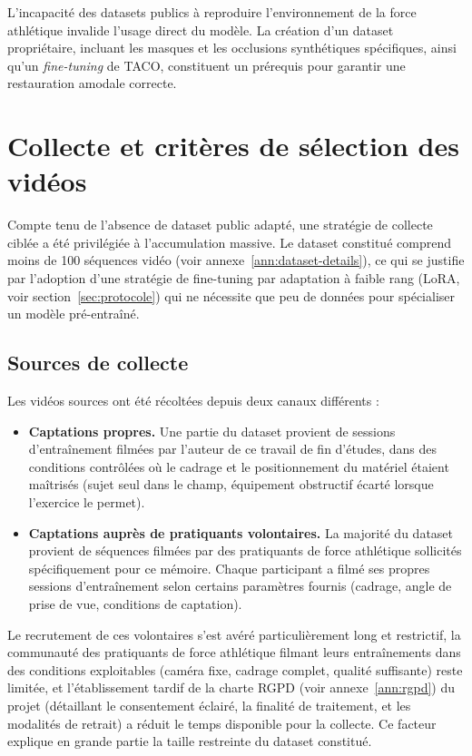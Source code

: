 L'incapacité des datasets publics à reproduire l'environnement de la force athlétique invalide l'usage direct du modèle. La création d'un dataset propriétaire, incluant les masques et les occlusions synthétiques spécifiques, ainsi qu'un \textit{fine-tuning} de TACO, constituent un prérequis pour garantir une restauration amodale correcte.

\section{Collecte et critères de sélection des vidéos}

Compte tenu de l'absence de dataset public adapté, une stratégie de collecte ciblée a été privilégiée à l'accumulation massive. Le dataset constitué comprend moins de 100 séquences vidéo (voir annexe~\ref{ann:dataset-details}), ce qui se justifie par l'adoption d'une stratégie de fine-tuning par adaptation à faible rang (LoRA, voir section~\ref{sec:protocole}) qui ne nécessite que peu de données pour spécialiser un modèle pré-entraîné.

\subsection{Sources de collecte}

Les vidéos sources ont été récoltées depuis deux canaux différents :

\begin{itemize}
  \item \textbf{Captations propres.} Une partie du dataset provient de sessions d'entraînement filmées par l'auteur de ce travail de fin d'études, dans des conditions contrôlées où le cadrage et le positionnement du matériel étaient maîtrisés (sujet seul dans le champ, équipement obstructif écarté lorsque l'exercice le permet).

  \item \textbf{Captations auprès de pratiquants volontaires.} La majorité du dataset provient de séquences filmées par des pratiquants de force athlétique sollicités spécifiquement pour ce mémoire. Chaque participant a filmé ses propres sessions d'entraînement selon certains paramètres fournis (cadrage, angle de prise de vue, conditions de captation).
\end{itemize}

Le recrutement de ces volontaires s'est avéré particulièrement long et restrictif, la communauté des pratiquants de force athlétique filmant leurs entraînements dans des conditions exploitables (caméra fixe, cadrage complet, qualité suffisante) reste limitée, et l'établissement tardif de la charte RGPD (voir annexe~\ref{ann:rgpd}) du projet (détaillant le consentement éclairé, la finalité de traitement, et les modalités de retrait) a réduit le temps disponible pour la collecte. Ce facteur explique en grande partie la taille restreinte du dataset constitué.

